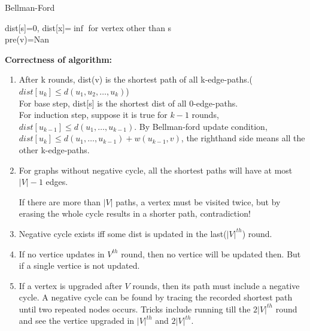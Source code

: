 \begin{algorithm}
    \caption{Bellman-Ford}
    dist[s]=0, dist[x]=$\inf$ for vertex other than s\\
    pre(v)=Nan\\
\end{algorithm}
\textbf{Correctness of algorithm:}
\begin{enumerate}
    \item After k rounds, dist(v) is the shortest path of all k-edge-paths.($dist[u_k]\leq d(u_1,u_2,\ldots,u_k)$)\\
    For base step, dist[s] is the shortest dist of all 0-edge-paths.\\
    For induction step, suppose it is true for $k-1$ rounds, $dist[u_{k-1}] \leq d(u_1,\ldots,u_{k-1})$. By Bellman-ford update condition, $dist[u_{k}]\leq d(u_1,\ldots,u_{k-1})+w(u_{k-1},v)$, the righthand side means all the other k-edge-paths.
    \item For graphs without negative cycle, all the shortest paths will have at most $|V|-1$ edges.
    
    If there are more than $|V|$ paths, a vertex must be visited twice, but by erasing the whole cycle results in a shorter path, contradiction!
    \item Negative cycle exists iff some dist is updated in the last($|V|^{th}$) round.
    \item If no vertice updates in $V^{th}$ round, then no vertice will be updated then. But if a single vertice is not updated.
    \item If a vertex is upgraded after $V$ rounds, then its path must include a negative cycle.
    A negative cycle can be found by tracing the recorded shortest path until two repeated nodes occurs. Tricks include running till the $2|V|^{th}$ round and see the vertice upgraded in $|V|^{th}$ and $2|V|^{th}$.
\end{enumerate}
